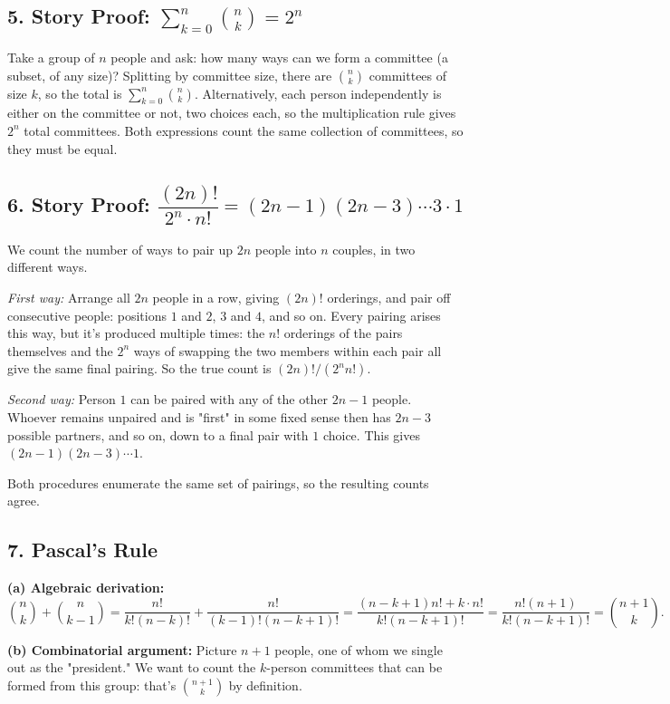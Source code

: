 \documentclass{article}
\begin{document}
\subsection*{5. Story Proof: $\sum_{k=0}^n \binom{n}{k} = 2^n$}

Take a group of $n$ people and ask: how many ways can we form a committee (a subset, of any size)? Splitting by committee size, there are $\binom{n}{k}$ committees of size $k$, so the total is $\sum_{k=0}^n \binom{n}{k}$. Alternatively, each person independently is either on the committee or not, two choices each, so the multiplication rule gives $2^n$ total committees. Both expressions count the same collection of committees, so they must be equal.

\subsection*{6. Story Proof: $\dfrac{(2n)!}{2^n \cdot n!} = (2n-1)(2n-3)\cdots 3 \cdot 1$}

We count the number of ways to pair up $2n$ people into $n$ couples, in two different ways.

\emph{First way:} Arrange all $2n$ people in a row, giving $(2n)!$ orderings, and pair off consecutive people: positions $1$ and $2$, $3$ and $4$, and so on. Every pairing arises this way, but it's produced multiple times: the $n!$ orderings of the pairs themselves and the $2^n$ ways of swapping the two members within each pair all give the same final pairing. So the true count is $(2n)!/(2^n n!)$.

\emph{Second way:} Person $1$ can be paired with any of the other $2n-1$ people. Whoever remains unpaired and is "first" in some fixed sense then has $2n-3$ possible partners, and so on, down to a final pair with $1$ choice. This gives $(2n-1)(2n-3)\cdots 1$.

Both procedures enumerate the same set of pairings, so the resulting counts agree.

\subsection*{7. Pascal's Rule}

\textbf{(a) Algebraic derivation:}
$$
\binom{n}{k} + \binom{n}{k-1} = \frac{n!}{k!(n-k)!} + \frac{n!}{(k-1)!(n-k+1)!}
= \frac{(n-k+1)n! + k \cdot n!}{k!(n-k+1)!}
= \frac{n!(n+1)}{k!(n-k+1)!}
= \binom{n+1}{k}.
$$

\medskip
\textbf{(b) Combinatorial argument:} Picture $n+1$ people, one of whom we single out as the "president." We want to count the $k$-person committees that can be formed from this group: that's $\binom{n+1}{k}$ by definition.
\end{document}
